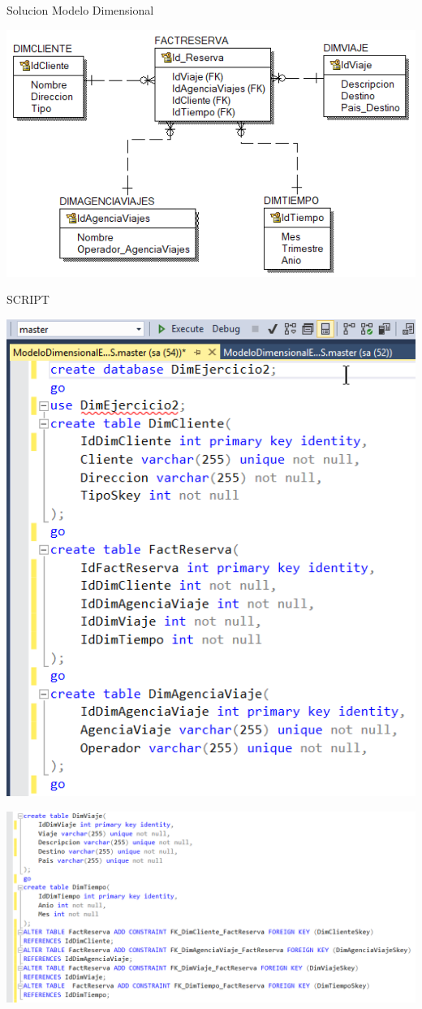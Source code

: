 \documentclass[12pt,letterpaper]{article}
\begin{document}
Solucion
Modelo Dimensional
\begin{center}
\includegraphics[width=17cm]{IMG/ejer2.png} 
\end{center}
 \newpage
SCRIPT
\begin{center}
\includegraphics[width=17cm]{IMG/sql2.png} 
\end{center}
 \newpage
\begin{center}
\includegraphics[width=18cm]{IMG/sql2-1.png} 
\end{center}
 \newpage
\end{document}
